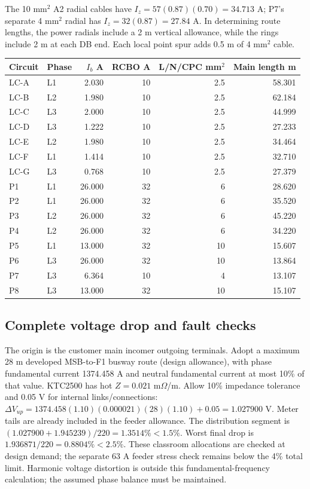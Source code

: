 The 10 mm$^2$ A2 radial cables have $I_z=57(0.87)(0.70)=34.713$ A;  P7's separate 4 mm$^2$ radial has $I_z=32(0.87)=27.84$ A. In determining route lengths, the power radials include a 2 m vertical allowance, while the rings include 2 m at each DB end. Each local point spur adds 0.5 m of 4 mm$^2$ cable.
\begingroup\small\renewcommand{\arraystretch}{1.0}
\begin{longtable}{llrrrr}\toprule
Circuit & Phase & $I_b$ A & RCBO A & L/N/CPC mm$^2$ & Main length m\\\midrule\endhead

LC-A & L1 & 2.030 & 10 & 2.5 & 58.301 \\
LC-B & L2 & 1.980 & 10 & 2.5 & 62.184 \\
LC-C & L3 & 2.000 & 10 & 2.5 & 44.999 \\
LC-D & L3 & 1.222 & 10 & 2.5 & 27.233 \\
LC-E & L2 & 1.980 & 10 & 2.5 & 34.464 \\
LC-F & L1 & 1.414 & 10 & 2.5 & 32.710 \\
LC-G & L3 & 0.768 & 10 & 2.5 & 27.379 \\
P1 & L1 & 26.000 & 32 & 6 & 28.620 \\
P2 & L1 & 26.000 & 32 & 6 & 35.520 \\
P3 & L2 & 26.000 & 32 & 6 & 45.220 \\
P4 & L2 & 26.000 & 32 & 6 & 34.220 \\
P5 & L1 & 13.000 & 32 & 10 & 15.607 \\
P6 & L3 & 26.000 & 32 & 10 & 13.864 \\
P7 & L3 & 6.364 & 10 & 4 & 13.107 \\
P8 & L3 & 13.000 & 32 & 10 & 15.107 \\

\bottomrule\end{longtable}
\endgroup
\subsection*{Complete voltage drop and fault checks}
The origin is the customer main incomer outgoing terminals. Adopt a maximum 28 m developed MSB-to-F1 busway route (design allowance), with phase fundamental current 1374.458 A and neutral fundamental current at most 10\% of that value. KTC2500 has hot $Z=0.021$ m$\Omega$/m. Allow 10\% impedance tolerance and 0.05 V for internal links/connections: $\Delta V_{up}=1374.458(1.10)(0.000021)(28)(1.10)+0.05=1.027900$ V. Meter tails are already included in the feeder allowance. The distribution segment is $(1.027900+1.945239)/220=1.3514\%<1.5\%$. Worst final drop is $1.936871/220=0.8804\%<2.5\%$. These classroom allocations are checked at design demand; the separate 63 A feeder stress check remains below the 4\% total limit. Harmonic voltage distortion is outside this fundamental-frequency calculation; the assumed phase balance must be maintained.


